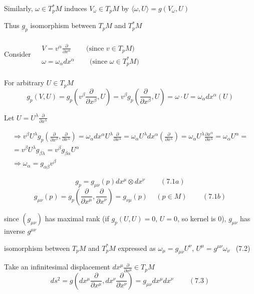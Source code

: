 \documentclass[twoside]{amsart}
\begin{document}
Similarly, $\omega \in T_p^*M$ induces $V_{\omega} \in T_pM$ by $\langle \omega, U \rangle = g(V_{\omega}, U)$ 

Thus $g_p$ isomorphism between $T_pM$ and $T_p^*M$

Consider $\begin{aligned} & \quad \\ 
  & V = v^{\alpha} \frac{ \partial }{ \partial x^{\alpha }} \quad \quad \, \text{(since $v \in T_pM$)} \\
  & \omega = \omega_{\alpha} dx^{\alpha} \quad \quad \, \text{(since $\omega \in T^*_pM$)} \\
\end{aligned}$

For arbitrary $U \in T_p M$
\[
g_p(V,U) = g_p( v^{\beta} \frac{ \partial }{ \partial x^{\beta} }, U ) = v^{\beta} g_p\left( \frac{ \partial }{ \partial x^{\beta} }, U \right) = \omega \cdot U  = \omega_{\alpha}dx^{\alpha}(U) 
\]

Let $U = U^{\lambda} \frac{ \partial }{ \partial x^{\lambda }}$

\[
\begin{gathered}
  \Longrightarrow v^{\beta} U^{\lambda} g_p\left( \frac{  \partial }{ \partial x^{\beta} }, \frac{ \partial }{ \partial x^{\lambda} } \right) = \omega_{\alpha} dx^{\alpha} U^{\lambda} \frac{ \partial }{ \partial x^{\lambda }} = \omega_{\alpha} U^{\lambda} dx^{\alpha} \left( \frac{ \partial }{ \partial x^{\lambda }} \right) = \omega_{\alpha} U^{\lambda} \frac{ \partial x^{\alpha }}{ \partial x^{\lambda }} = \omega_{\alpha} U^{\alpha } = \\
  = v^{\beta} U^{\lambda} g_{\beta \lambda} = v^{\beta} g_{\beta \alpha } U^{\alpha } \\
  \Longrightarrow \omega_{\alpha} = g_{\alpha \beta} v^{\beta}
\end{gathered}
\]

\[
g_p = g_{\mu \nu}(p) dx^{\mu} \otimes dx^{\nu} \quad \quad \, (7.1a)
\]
\[
g_{\mu \nu}(p) = g_p \left( \frac{ \partial }{ \partial x^{\mu }} , \frac{ \partial }{ \partial x^{\nu }} \right) = g_{\nu \mu}(p) \quad \, (p \in M) \quad \quad \, (7.1b)
\]

since $(g_{\mu \nu})$ has maximal rank (if $g_p(U,U) = 0$, $U=0$, so kernel is $0$), $g_{\mu \nu}$ has inverse $g^{\mu \nu}$

isomorphism between $T_p M$ and $T_p^*M$ expressed as $\omega_{\mu} = g_{\mu \nu} U^{\nu}$, $U^{\mu} = g^{\mu \nu} \omega_{\nu}$ \quad \, (7.2)

Take an infinitesimal displacement $dx^{\mu} \frac{ \partial }{ \partial x^{\mu} } \in T_p M$ 
\[
ds^2 = g \left( dx^{\mu} \frac{ \partial }{ \partial x^{\mu} }, dx^{\nu} \frac{ \partial }{ \partial x^{\nu} }\right) = g_{\mu \nu} dx^{\mu} dx^{\nu} \quad \quad \, (7.3)
\]
\end{document}
